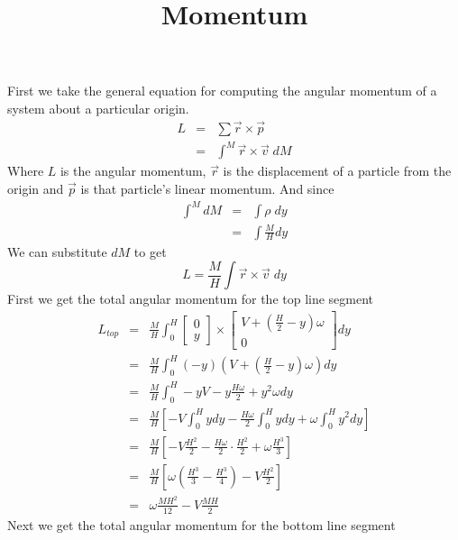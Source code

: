 \documentclass[12pt]{article}
\title{Momentum}
\date{}
\begin{document}
First we take the general equation for computing the angular momentum of a system about a
particular origin.
\begin{eqnarray*}
L   &=& \sum \vec{r} \times \vec{p} \nonumber \\
    &=& \int^{M} \vec{r} \times \vec{v} \; dM
\end{eqnarray*}
Where $L$ is the angular momentum, $\vec{r}$ is the displacement of a particle from the origin
and $\vec{p}$ is that particle's linear momentum.  And since
\begin{eqnarray*}
\int^{M} dM
    &=& \int \rho \; dy \nonumber \\
    &=& \int \frac{M}{H} dy
\end{eqnarray*}
We can substitute $dM$ to get
\begin{equation*}
L = \frac{M}{H} \int \vec{r} \times \vec{v} \; dy
\end{equation*}
First we get the total angular momentum for the top line segment
\begin{eqnarray*}
L_{top}
    &=& \frac{M}{H} \int_{0}^{H}
        \begin{bmatrix}
            0 \\
            y
        \end{bmatrix} \times
        \begin{bmatrix}
            V + \left( \frac{H}{2} - y \right) \omega \\
            0
        \end{bmatrix} dy \\
    &=& \frac{M}{H} \int_{0}^{H}
        \left( -y \right)
        \left( V + \left( \frac{H}{2} - y \right) \omega \right) dy \\
    &=& \frac{M}{H} \int_{0}^{H} -y V - y\frac{H \omega}{2} + y^2 \omega dy \\
    &=& \frac{M}{H}
        \left[
            - V \int_{0}^{H} y dy
            - \frac{H \omega}{2} \int_{0}^{H} y dy
            + \omega \int_{0}^{H} y^2 dy
        \right] \\
    &=& \frac{M}{H}
        \left[
            - V \frac{H^2}{2} - \frac{H \omega}{2} \cdot \frac{H^2}{2} + \omega \frac{H^3}{3}
        \right] \\
    &=& \frac{M}{H}
        \left[
            \omega \left( \frac{H^3}{3} - \frac{H^3}{4} \right) - V \frac{H^2}{2}
        \right] \\
    &=& \omega \frac{M H^2}{12} - V \frac{M H}{2}
\end{eqnarray*}
Next we get the total angular momentum for the bottom line segment
\end{document}
